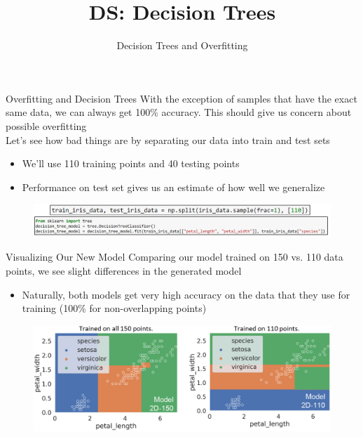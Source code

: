 \documentclass[aspectratio=169]{../latex_main/tntbeamer}  %
\title[Introduction]{DS: Decision Trees}
\subtitle{Decision Trees and Overfitting}
\begin{document}
	
	\maketitle
	\begin{frame}{Overfitting and Decision Trees}
	    With the exception of samples that have the exact same data, we can always get 100\% accuracy. This should give us concern about possible overfitting\\
	    \bigskip
	    Let’s see how bad things are by separating our data into train and test sets
	    \begin{itemize}
	        \item We’ll use 110 training points and 40 testing points
	        \item Performance on test set gives us an estimate of how well we generalize
	    \end{itemize}
	    \begin{figure}
	        \centering
	        \includegraphics[scale=.4]{Bild30}
	    \end{figure}
	\end{frame}
	
	\begin{frame}{Visualizing Our New Model}
	   Comparing our model trained on 150 vs. 110 data points, we see slight differences in the generated model\\
	    \begin{itemize}
	        \item Naturally, both models get very high accuracy on the data that they use for training (100\% for non-overlapping points)
	    \end{itemize}
	    \begin{figure}
	        \centering
	        \includegraphics[scale=.4]{Bild31}
	    \end{figure}
	\end{frame}
	
\end{document}
